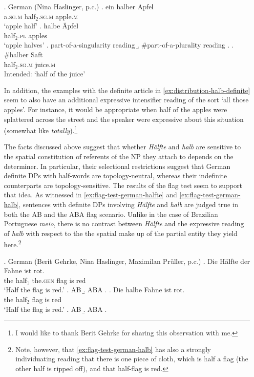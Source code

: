 \ex. German (Nina Haslinger, p.c.)\label{ex:distribution-halb}
\ag. ein halber Apfel\label{ex:distribution-halb-sg}\\
a\textsc{.sg.m}  half$_{2}$\textsc{.sg.m} apple\textsc{.m}\\
`apple half'
\bg. halbe Äpfel\label{ex:distribution-halb-pl}\\
half$_{2}$\textsc{.pl}  apples\\
`apple halves'
\a. part-of-a-singularity reading
\b. \#part-of-a-plurality reading
\z.
\bg. \#halber Saft\label{ex:distribution-halb-mass}\\
half$_{2}$\textsc{.sg.m} juice\textsc{.m} \\
Intended: `half of the juice'

In addition, the examples with the definite article in \ref{ex:distribution-halb-definite} seem to also have an additional expressive intensifier reading of the sort `all those apples'. For instance, it would be appropriate when half of the apples were splattered across the street and the speaker were expressive about this situation (somewhat like \textit{totally}).\footnote{I would like to thank Berit Gehrke for sharing this observation with me.}\largerpage

The facts discussed above suggest that whether \textit{Hälfte} and \textit{halb} are sensitive to the spatial constitution of referents of the NP they attach to depends on the determiner. In particular, their selectional restrictions suggest that German definite DPs with half-words are topology-neutral, whereas their indefinite counterparts are topology-sensitive. The results of the flag test seem to support that idea. As witnessed in \ref{ex:flag-test-german-halfte} and \ref{ex:flag-test-german-halb}, sentences with definite DPs involving \textit{Hälfte} and \textit{halb} are judged true in both the AB and the ABA flag scenario. Unlike in the case of Brazilian Portuguese \textit{meio}, there is no contrast between \textit{Hälfte} and the expressive reading of \textit{halb} with respect to the the spatial make up of the partial entity they yield here.\footnote{Note, however, that \ref{ex:flag-test-german-halb} has also a strongly individuating reading that there is one piece of cloth, which is half a flag (the other half is ripped off), and that half-flag is red.}

\ex. German (Berit Gehrke, Nina Haslinger, Maximilan Prüller, p.c.)\label{ex:flag-test-german}
\ag. Die Hälfte der Fahne ist rot.\label{ex:flag-test-german-halfte}\\
		the half$_1$ the\textsc{.gen} flag is red\\
		`Half the flag is red.'
		\a. AB
		\b. ABA
		\z.
		\bg. Die halbe Fahne ist rot.\label{ex:flag-test-german-halb}\\
		the half$_2$ flag is red\\
		`Half the flag is red.'
		\a. AB
		\b. ABA
		\z.

